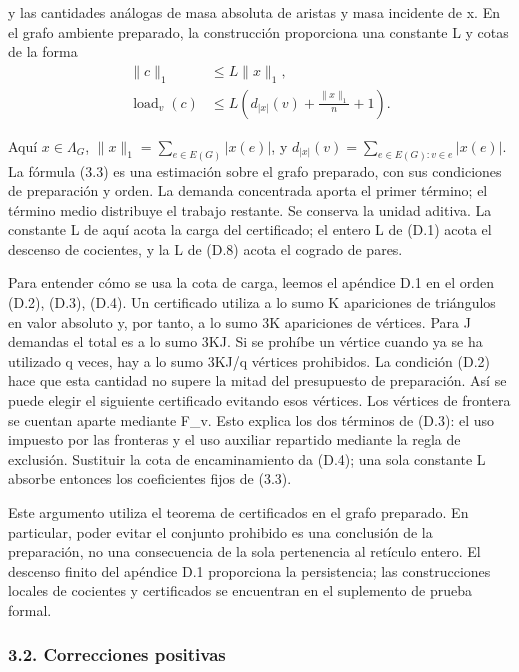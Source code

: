 \documentclass[spanish,11pt,a4paper]{article}
\begin{document}
y las cantidades análogas de masa absoluta de aristas y masa incidente de x. En el grafo ambiente preparado, la construcción proporciona una constante L y cotas de la forma
\[\begin{aligned}
\|c\|_1&\leq L\|x\|_1,\\
\operatorname{load}_v(c)&\leq
 L\left(d_{|x|}(v)+\frac{\|x\|_1}{n}+1\right).
\end{aligned}                                                       \tag{3.3}\]

Aquí \(x\in\Lambda_G\), \(\|x\|_1=\sum_{e\in E(G)}|x(e)|\), y \(d_{|x|}(v)=\sum_{e\in E(G):v\in e}|x(e)|\). La fórmula (3.3) es una estimación sobre el grafo preparado, con sus condiciones de preparación y orden. La demanda concentrada aporta el primer término; el término medio distribuye el trabajo restante. Se conserva la unidad aditiva. La constante L de aquí acota la carga del certificado; el entero L de (D.1) acota el descenso de cocientes, y la L de (D.8) acota el cogrado de pares.

Para entender cómo se usa la cota de carga, leemos el apéndice D.1 en el orden (D.2), (D.3), (D.4). Un certificado utiliza a lo sumo K apariciones de triángulos en valor absoluto y, por tanto, a lo sumo 3K apariciones de vértices. Para J demandas el total es a lo sumo 3KJ. Si se prohíbe un vértice cuando ya se ha utilizado q veces, hay a lo sumo 3KJ/q vértices prohibidos. La condición (D.2) hace que esta cantidad no supere la mitad del presupuesto de preparación. Así se puede elegir el siguiente certificado evitando esos vértices. Los vértices de frontera se cuentan aparte mediante F\_v. Esto explica los dos términos de (D.3): el uso impuesto por las fronteras y el uso auxiliar repartido mediante la regla de exclusión. Sustituir la cota de encaminamiento da (D.4); una sola constante L absorbe entonces los coeficientes fijos de (3.3).

Este argumento utiliza el teorema de certificados en el grafo preparado. En particular, poder evitar el conjunto prohibido es una conclusión de la preparación, no una consecuencia de la sola pertenencia al retículo entero. El descenso finito del apéndice D.1 proporciona la persistencia; las construcciones locales de cocientes y certificados se encuentran en el suplemento de prueba formal.

\subsubsection{3.2. Correcciones positivas}\label{correcciones-positivas}
\end{document}

